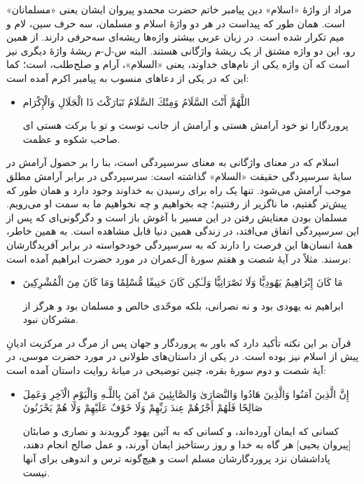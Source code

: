 مراد از واژهٔ «اسلام» دین پیامبر خاتم حضرت محمد{}و پیروان ایشان یعنی «مسلمانان» است. همان طور که پیداست در هر دو واژهٔ‌ اسلام و مسلمان، سه حرف سین، لام و میم تکرار شده است. در زبان عربی بیشتر واژه‌ها ریشه‌ای سه‌حرفی دارند. از همین رو، این دو واژه مشتق از یک ریشهٔ واژگانی هستند. البته س-ل-م ریشهٔ واژهٔ دیگری نیز است که آن واژه یکی از نام‌های خداوند، یعنی «السلام»، آرام و صلح‌طلب، است؛ کما این که در یکی از دعاهای منسوب به پیامبر اکرم{} آمده است:
\begin{itemize}
	\item[]
	{
		اللَّهُمَّ أَنْتَ السَّلَامُ وَمِنْكَ السَّلَامُ تَبَارَكْتَ ذَا الْجَلَالِ وَالْإِكْرَام}
	
	{ پروردگارا تو خود آرامش هستی و آرامش از جانب توست و تو با برکت هستی ای صاحب شکوه و عظمت.}
\end{itemize}

اسلام که در معنای واژگانی به معنای سرسپردگی است، بنا را بر حصول آرامش در سایهٔ سرسپردگی حقیقت «السلام» گذاشته است: سرسپردگی در برابر آرامش مطلق موجب آرامش می‌شود. تنها یک راه برای رسیدن به خداوند وجود دارد و همان طور که پیش‌تر گفتیم، ما ناگزیر از رفتنیم؛ چه بخواهیم و چه نخواهیم ما به سمت او می‌رویم. مسلمان بودن معنایش رفتن در این مسیر با آغوش باز است و دگرگونی‌ای که پس از این سرسپردگی اتفاق می‌افتد، در زندگی همین دنیا قابل مشاهده است. به همین خاطر، همهٔ انسان‌ها این فرصت را دارند که به سرسپردگی خودخواسته در برابر آفریدگارشان برسند. مثلاً در آیهٔ شصت و هفتم سورهٔ آل‌عمران در مورد حضرت ابراهیم{} آمده است:
\begin{itemize}
	\item[]
	{
		مَا كَانَ إِبْرَاهِيمُ يَهُودِيًّا وَلَا نَصْرَانِيًّا وَلَـٰكِن كَانَ حَنِيفًا مُّسْلِمًا وَمَا كَانَ مِنَ الْمُشْرِكِينَ}
	
	{ ابراهیم نه یهودی بود و نه نصرانی، بلکه موحّدی خالص و مسلمان بود و هرگز از مشرکان نبود.}
\end{itemize}

قرآن بر این نکته تأکید دارد که باور به پروردگار و جهان پس از مرگ در مرکزیت ادیانِ پیش از اسلام نیز بوده است. در یکی از داستان‌های طولانی در مورد حضرت موسی{}، در آیهٔ شصت و دوم سورهٔ بقره، چنین توضیحی در میانهٔ روایت داستان آمده است:


\begin{itemize}
	\item[]
	{
		إِنَّ الَّذِينَ آمَنُوا وَالَّذِينَ هَادُوا وَالنَّصَارَىٰ وَالصَّابِئِينَ مَنْ آمَنَ بِاللَّـهِ وَالْيَوْمِ الْآخِرِ وَعَمِلَ صَالِحًا فَلَهُمْ أَجْرُهُمْ عِندَ رَبِّهِمْ وَلَا خَوْفٌ عَلَيْهِمْ وَلَا هُمْ يَحْزَنُونَ}
	
	{
		کسانی که ایمان آورده‌اند، و کسانی که به آئین یهود گرویدند و نصاری و صابئان [پیروان یحیی‌] هر گاه به خدا و روز رستاخیز ایمان آورند، و عمل صالح انجام دهند، پاداششان نزد پروردگارشان مسلم است و هیچ‌گونه ترس و اندوهی برای آنها نیست.}
\end{itemize}


